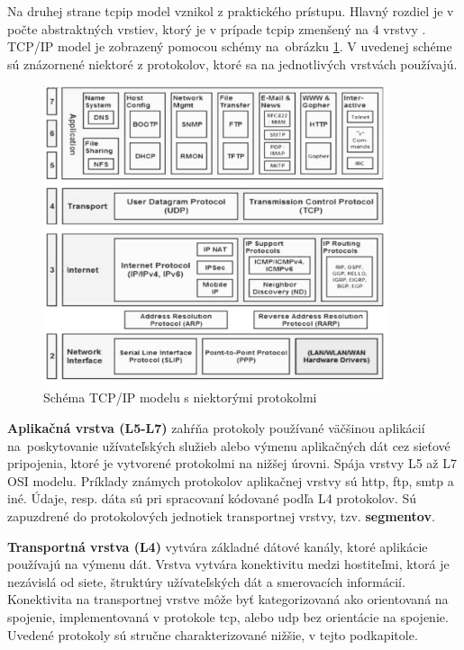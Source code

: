 Na druhej strane \acrshort{tcpip} model vznikol z praktického prístupu. Hlavný rozdiel je v počte abstraktných vrstiev, ktorý je v prípade \acrshort{tcpip} zmenšený na 4 vrstvy \cite{tcp}. 
TCP/IP model je zobrazený pomocou schémy na~obrázku \ref{tcpipprot}. V uvedenej schéme sú znázornené niektoré z protokolov, ktoré sa na jednotlivých vrstvách používajú.

\begin{figure}[!ht]
	\centering
	\includegraphics[width=0.9\textwidth]{figures/tcpiprot}
	\caption{Schéma TCP/IP modelu s niektorými protokolmi \cite{tcpguide}}
	\label{tcpipprot}
\end{figure}

\textbf{Aplikačná vrstva (L5-L7)} zahŕňa protokoly používané väčšinou aplikácií na~poskytovanie užívateľských služieb alebo výmenu aplikačných dát cez sieťové pripojenia, ktoré je vytvorené protokolmi na nižšej úrovni.  Spája vrstvy L5 až L7 OSI modelu. Príklady známych protokolov aplikačnej vrstvy sú \acrfull{http}, \acrfull{ftp}, \acrfull{smtp} a iné. Údaje, resp. dáta sú pri spracovaní kódované podľa L4 protokolov. Sú zapuzdrené do protokolových jednotiek transportnej vrstvy, tzv. \textbf{segmentov}.  

\textbf{Transportná vrstva (L4)} vytvára základné dátové kanály, ktoré aplikácie používajú na výmenu dát. Vrstva vytvára konektivitu medzi hostiteľmi, ktorá je nezávislá od siete, štruktúry užívateľských dát a smerovacích informácií. Konektivita na transportnej vrstve môže byť kategorizovaná ako orientovaná na spojenie, implementovaná v protokole \acrshort{tcp}, alebo \acrshort{udp} bez orientácie na spojenie. Uvedené protokoly sú stručne charakterizované nižšie, v tejto podkapitole. 

